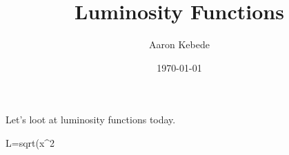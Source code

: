 \documentclass{article}
\title{Luminosity Functions}
\author{Aaron Kebede}
\date{\today}
\begin{document}
\maketitle

Let's loot at luminosity functions today.

L=sqrt(x^2
\end{document}

